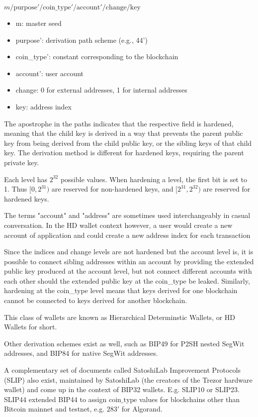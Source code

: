 \documentclass[12pt, a4paper, twocolumn]{article}
\begin{document}
$m / \text{purpose}' / \text{coin\_type}' / \text{account}' / \text{change} / \text{key}$

\begin{itemize}
  \item m: master seed
  \item purpose': derivation path scheme (e.g., 44')
  \item coin\_type': constant corresponding to the blockchain
  \item account': user account
  \item change: 0 for external addresses, 1 for internal addresses
  \item key: address index
\end{itemize}

The apostrophe in the paths indicates that the respective field is hardened, meaning that the child key is derived in a way that prevents the parent public key from being derived from the child public key, or the sibling keys of that child key. The derivation method is different for hardened keys, requiring the parent private key.

Each level has $2^{32}$ possible values. When hardening a level, the first bit is set to 1. Thus $[0, 2^{31})$ are reserved for non-hardened keys, and $[2^{31}, 2^{32})$ are reserved for hardened keys.

The terms "account" and "address" are sometimes used interchangeably in casual conversation. In the HD wallet context however, a user would create a new account of application and could create a new address index for each transaction

Since the indices and change levels are not hardened but the account level is, it is possible to connect sibling addresses within an account by providing the extended public key produced at the account level, but not connect different accounts with each other should the extended public key at the coin\_type be leaked. Similarly, hardening at the coin\_type level means that keys derived for one blockchain cannot be connected to keys derived for another blockchain.

This class of wallets are known as Hierarchical Determinstic Wallets, or HD Wallets for short.

Other derivation schemes exist as well, such as BIP49 for P2SH nested SegWit addresses, and BIP84 for native SegWit addresses.

A complementary set of documents called SatoshiLab Improvement Protocols (SLIP) also exist, maintained by SatoshiLab (the creators of the Trezor hardware wallet) and come up in the context of BIP32 wallets. E.g. SLIP10 or SLIP23. SLIP44 extended BIP44 to assign $\text{coin\_type}$ values for blockchains other than Bitcoin mainnet and testnet, e.g. $\text{283}'$ for Algorand.
\end{document}
